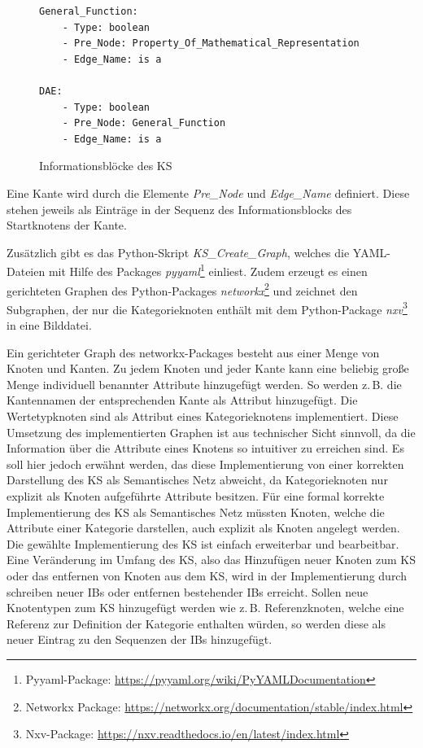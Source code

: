 \begin{figure}[b]
	\centering
	\begin{adjustbox}{padding=15pt 0pt 0pt 0pt, fbox}
	\begin{lstlisting}[basicstyle=\footnotesize]
General_Function:
	- Type: boolean
	- Pre_Node: Property_Of_Mathematical_Representation
	- Edge_Name: is a

DAE: 
	- Type: boolean
	- Pre_Node: General_Function
	- Edge_Name: is a
	\end{lstlisting}
	\end{adjustbox}
	\caption{Informationsblöcke des KS}
	\label{fig:IBs}
\end{figure}

Eine Kante wird durch die Elemente \textit{Pre\_Node} und \textit{Edge\_Name} definiert. Diese stehen jeweils als Einträge in der Sequenz des Informationsblocks des Startknotens der Kante.

Zusätzlich gibt es das Python-Skript \textit{KS\_Create\_Graph}, welches die YAML-Dateien mit Hilfe des Packages \textit{pyyaml}\footnote{Pyyaml-Package: \url{https://pyyaml.org/wiki/PyYAMLDocumentation}} einliest. Zudem erzeugt es einen gerichteten Graphen des Python-Packages \textit{networkx}\footnote{Networkx Package: \url{https://networkx.org/documentation/stable/index.html}} und zeichnet den Subgraphen, der nur die Kategorieknoten enthält mit dem Python-Package \textit{nxv}\footnote{Nxv-Package: \url{https://nxv.readthedocs.io/en/latest/index.html}} in eine Bilddatei.

Ein gerichteter Graph des networkx-Packages besteht aus einer Menge von Knoten und Kanten. Zu jedem Knoten und jeder Kante kann eine beliebig große Menge individuell benannter Attribute hinzugefügt werden. So werden z.\,B. die Kantennamen der entsprechenden Kante als Attribut hinzugefügt. Die Wertetypknoten sind als Attribut eines Kategorieknotens implementiert. Diese Umsetzung des implementierten Graphen ist aus technischer Sicht sinnvoll, da die Information über die Attribute eines Knotens so intuitiver zu erreichen sind. Es soll hier jedoch erwähnt werden, das diese Implementierung von einer korrekten Darstellung des KS als Semantisches Netz abweicht, da Kategorieknoten nur explizit als Knoten aufgeführte Attribute besitzen. Für eine formal korrekte Implementierung des KS als Semantisches Netz müssten Knoten, welche die Attribute einer Kategorie darstellen, auch explizit als Knoten angelegt werden.\\
Die gewählte Implementierung des KS ist einfach erweiterbar und bearbeitbar. Eine Veränderung im Umfang des KS, also das Hinzufügen neuer Knoten zum KS oder das entfernen von Knoten aus dem KS, wird in der Implementierung durch schreiben neuer IB\grq s oder entfernen bestehender IB\grq s erreicht. Sollen neue Knotentypen zum KS hinzugefügt werden wie z.\,B. Referenzknoten, welche eine Referenz zur Definition der Kategorie enthalten würden, so werden diese als neuer Eintrag zu den Sequenzen der IB\grq s hinzugefügt.

